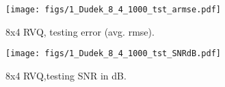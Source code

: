 								\begin{figure}[h!]
								\centering
								\texttt{[image: figs/1\_Dudek\_8\_4\_1000\_tst\_armse.pdf]}
								\caption{8x4 RVQ, testing error (avg. rmse).}
								\label{fig:1_Dudek_8_4_1000_tst_armse}
								\end{figure}

								\begin{figure}[h!]
								\centering
								\texttt{[image: figs/1\_Dudek\_8\_4\_1000\_tst\_SNRdB.pdf]}
								\caption{8x4 RVQ,testing SNR in dB.}
								\label{fig:1_Dudek_8_4_1000_tst_SNRdB}
								\end{figure}